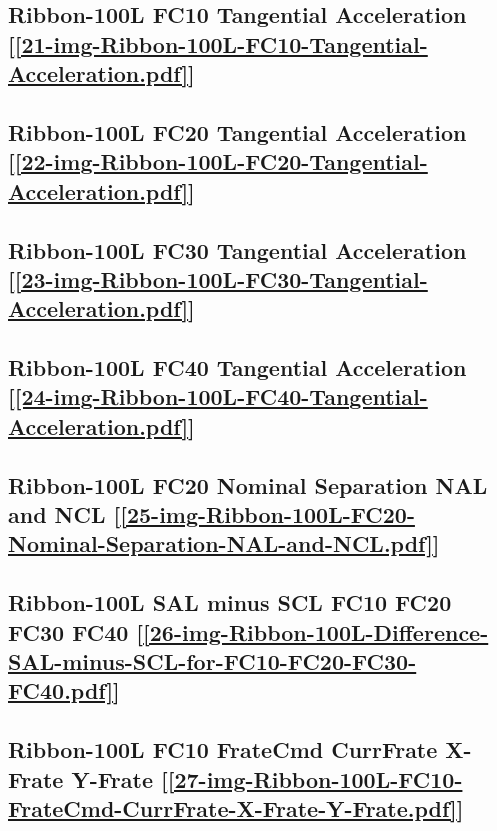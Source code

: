 \subsection       {Ribbon-100L FC10 Tangential Acceleration
	[\ref      {21-img-Ribbon-100L-FC10-Tangential-Acceleration.pdf}] }
\label{ssec-21-img-Ribbon-100L-FC10-Tangential-Acceleration.pdf}

\subsection       {Ribbon-100L FC20 Tangential Acceleration
	[\ref      {22-img-Ribbon-100L-FC20-Tangential-Acceleration.pdf}] }
\label{ssec-22-img-Ribbon-100L-FC20-Tangential-Acceleration.pdf}

\subsection       {Ribbon-100L FC30 Tangential Acceleration
	[\ref      {23-img-Ribbon-100L-FC30-Tangential-Acceleration.pdf}] }
\label{ssec-23-img-Ribbon-100L-FC30-Tangential-Acceleration.pdf}

\subsection       {Ribbon-100L FC40 Tangential Acceleration
	[\ref      {24-img-Ribbon-100L-FC40-Tangential-Acceleration.pdf}] }
\label{ssec-24-img-Ribbon-100L-FC40-Tangential-Acceleration.pdf}

\subsection       {Ribbon-100L FC20 Nominal Separation NAL and NCL
	[\ref      {25-img-Ribbon-100L-FC20-Nominal-Separation-NAL-and-NCL.pdf}] }
\label{ssec-25-img-Ribbon-100L-FC20-Nominal-Separation-NAL-and-NCL.pdf}

\subsection       {Ribbon-100L SAL minus SCL FC10 FC20 FC30 FC40
	[\ref      {26-img-Ribbon-100L-Difference-SAL-minus-SCL-for-FC10-FC20-FC30-FC40.pdf}] }
\label{ssec-26-img-Ribbon-100L-Difference-SAL-minus-SCL-for-FC10-FC20-FC30-FC40.pdf}


\subsection       {Ribbon-100L FC10 FrateCmd CurrFrate X-Frate Y-Frate
	[\ref      {27-img-Ribbon-100L-FC10-FrateCmd-CurrFrate-X-Frate-Y-Frate.pdf}] }
\label{ssec-27-img-Ribbon-100L-FC10-FrateCmd-CurrFrate-X-Frate-Y-Frate.pdf}

